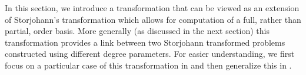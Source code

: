 \begin{comment}
\begin{itemize}
\item $\vec{e}$: uniform 0 shift used for transformation. 
\item $\vec{s}$: original input shift 
\item $\vec{t}$: output shifted degrees of the current basis, with result
from previous subproblems included. i.e., $\left[\vec{s},0,\dots,0\right]$-degrees
of the current basis. 
\item $\vec{b},\vec{a}$: input shift and output shifted degrees for each
reduced subproblem that calls OrderBasis. In the iterative computational
process, input shift $\vec{b}^{\left(i-1\right)}$ corresponds to
input shift $\vec{a}^{\left(i\right)}$. The high degree entries of
$\vec{a}^{\left(i\right)}$ at iteration $i$ is then used as the
input shift $\vec{b}^{\left(i\right)}$ for iteration $i$. 
\end{itemize}
\item dimension:

\begin{itemize}
\item $m,n$: row, column dimension 
\item $k$: number of columns with $\left[\vec{s},0,\dots,0\right]$-degrees
less than degree bound 
\item $l$: number of block rows 
\end{itemize}
\item degrees, order:

\begin{itemize}
\item $\sigma$: order 
\item $\delta$: degree bound 
\item $d$: average degree (=$m\sigma/n$) \end{itemize}
\end{itemize}
\end{comment}


In this section, we introduce a transformation that can be viewed
as an extension of Storjohann's transformation which allows for computation
of a full, rather than partial, order basis. More generally (as discussed
in the next section) this transformation provides a link between two
Storjohann transformed problems constructed using different degree
parameters. For easier understanding, we first focus on a particular
case of this transformation in  and
then generalize this in .


